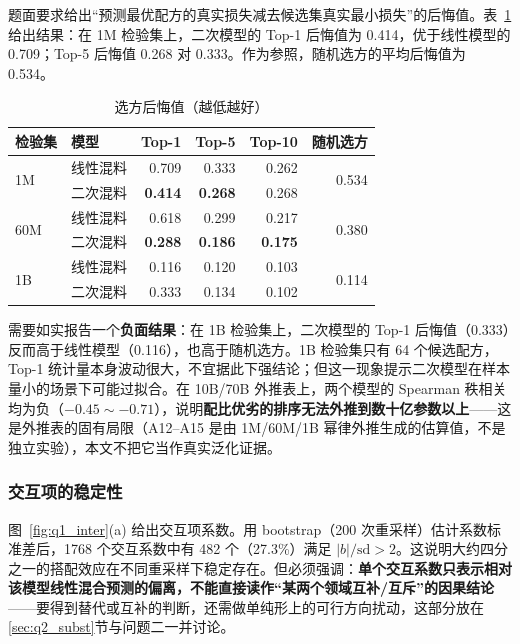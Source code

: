 题面要求给出``预测最优配方的真实损失减去候选集真实最小损失''的后悔值。表~\ref{tab:q1_regret} 给出结果：在 1M 检验集上，二次模型的 Top-1 后悔值为 0.414，优于线性模型的 0.709；Top-5 后悔值 0.268 对 0.333。作为参照，随机选方的平均后悔值为 0.534。

\begin{table}[htbp]
\centering
\caption{选方后悔值（越低越好）}
\label{tab:q1_regret}
\small
\begin{tabular}{l|l|r|r|r|r}
\toprule
\textbf{检验集} & \textbf{模型} & \textbf{Top-1} & \textbf{Top-5} & \textbf{Top-10} & \textbf{随机选方} \\
\midrule
\multirow{2}{*}{1M} & 线性混料 & 0.709 & 0.333 & 0.262 & \multirow{2}{*}{0.534} \\
                    & 二次混料 & \textbf{0.414} & \textbf{0.268} & 0.268 & \\
\midrule
\multirow{2}{*}{60M} & 线性混料 & 0.618 & 0.299 & 0.217 & \multirow{2}{*}{0.380} \\
                     & 二次混料 & \textbf{0.288} & \textbf{0.186} & \textbf{0.175} & \\
\midrule
\multirow{2}{*}{1B} & 线性混料 & 0.116 & 0.120 & 0.103 & \multirow{2}{*}{0.114} \\
                    & 二次混料 & 0.333 & 0.134 & 0.102 & \\
\bottomrule
\end{tabular}
\end{table}

需要如实报告一个\textbf{负面结果}：在 1B 检验集上，二次模型的 Top-1 后悔值（0.333）反而高于线性模型（0.116），也高于随机选方。1B 检验集只有 64 个候选配方，Top-1 统计量本身波动很大，不宜据此下强结论；但这一现象提示二次模型在样本量小的场景下可能过拟合。在 10B/70B 外推表上，两个模型的 Spearman 秩相关均为负（$-0.45\sim-0.71$），说明\textbf{配比优劣的排序无法外推到数十亿参数以上}——这是外推表的固有局限（A12--A15 是由 1M/60M/1B 幂律外推生成的估算值，不是独立实验），本文不把它当作真实泛化证据。

\subsubsection{交互项的稳定性}

图~\ref{fig:q1_inter}(a) 给出交互项系数。用 bootstrap（200 次重采样）估计系数标准差后，1768 个交互系数中有 482 个（27.3\%）满足 $|b|/\mathrm{sd}>2$。这说明大约四分之一的搭配效应在不同重采样下稳定存在。但必须强调：\textbf{单个交互系数只表示相对该模型线性混合预测的偏离，不能直接读作``某两个领域互补/互斥''的因果结论}——要得到替代或互补的判断，还需做单纯形上的可行方向扰动，这部分放在\ref{sec:q2_subst}节与问题二一并讨论。

